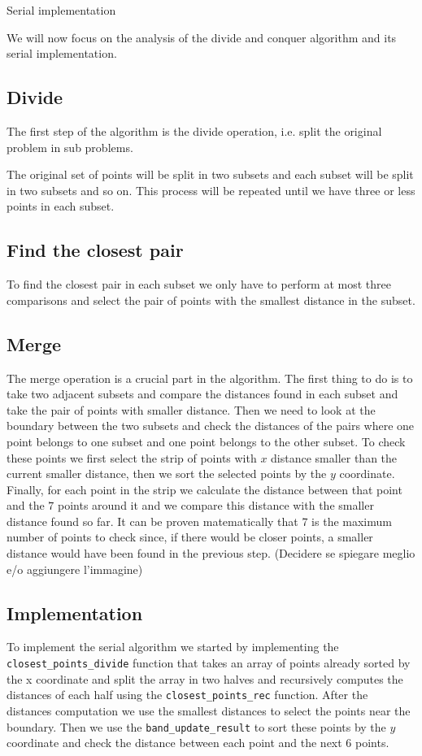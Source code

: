 Serial implementation

We will now focus on the analysis of the divide and conquer algorithm 
and its serial implementation.

\subsection{Divide}
The first step of the algorithm is the divide operation, i.e.
split the original problem in sub problems. 

The original set of points will be split in two subsets and each
subset will be split in two subsets and so on. This process will be repeated
until we have three or less points in each subset.

\subsection{Find the closest pair}
To find the closest pair in each subset we only have to perform
at most three comparisons and select the pair of points with the smallest
distance in the subset.

\subsection{Merge}
The merge operation is a crucial part in the algorithm.
The first thing to do is to take two adjacent subsets and compare the distances
found in each subset and take the pair of points with smaller distance. Then we 
need to look at the boundary between the two subsets and check the distances of 
the pairs where one point belongs to one subset and one point belongs to the other
subset. To check these points we first select the strip of points with $x$ distance smaller
than the current smaller distance, then we sort the selected points by the $y$ coordinate.
Finally, for each point in the strip we calculate the distance between that point and 
the $7$ points around it and we compare this distance with the smaller distance found so far.
It can be proven matematically that 7 is the maximum number of points to check since, if there 
would be closer points, a smaller distance would have been found in the previous step.
(Decidere se spiegare meglio e/o aggiungere l'immagine)

\subsection{Implementation}
To implement the serial algorithm we started by implementing the \verb+closest_points_divide+ 
function that takes an array of points already sorted by the x coordinate and split the array in two 
halves and recursively computes the distances of each half using the \verb+closest_points_rec+ 
function. After the distances computation we use the smallest distances to select the points
near the boundary. Then we use the \verb+band_update_result+ to sort these points by the $y$ coordinate
and check the distance between each point and the next 6 points.
